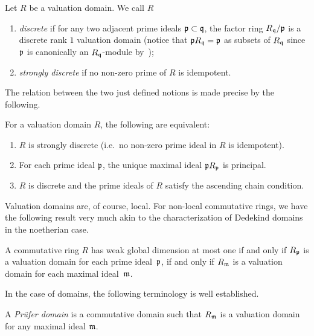 \documentclass[reqno,a4paper]{amsart}
\begin{document}
\begin{definition} \label{def:discrete-VD} Let $R$ be a valuation domain. We call $R$
\begin{enumerate}
\item \emph{discrete} if for any two adjacent prime ideals $\mathfrak{p}\subset\mathfrak{q}$, the factor ring $R_{\mathfrak{q}}/\mathfrak{p}$ is a discrete rank $1$ valuation domain (notice that $\mathfrak{p} R_{\mathfrak{q}} = \mathfrak{p}$ as subsets of $R_{\mathfrak{q}}$ since $\mathfrak{p}$ is canonically an $R_{\mathfrak{q}}$-module by~\cite[Lemma~4.3(iv)]{fs01});
\item \emph{strongly discrete} if no non-zero prime of $R$ is idempotent.
\end{enumerate}
\end{definition}

The relation between the two just defined notions is made precise by the following.

\begin{theorem}[{\cite[\S II Theorem 8.3]{fs01}}]\label{thm:propertiesStrong}
For a valuation domain $R$, the following are equivalent:
\begin{enumerate}
    \item $R$ is strongly discrete (i.e.\ no non-zero prime ideal in $R$ is idempotent).
    \item For each prime ideal $\mathfrak{p}$, the unique maximal ideal $\mathfrak{p} R_{\mathfrak{p}}$ is principal.
    \item $R$ is discrete and the prime ideals of $R$ satisfy the ascending chain condition.
\end{enumerate}
\end{theorem}

Valuation domains are, of course, local. For non-local commutative rings, we have the following result very much akin to the characterization of Dedekind domains in the noetherian case.

\begin{lemma}\label{lem:wgld1}
    A commutative ring $R$ has weak global dimension at most one if and only if $R_{\mathfrak{p}}$ is a valuation domain for each prime ideal~$\mathfrak{p}$, if and only if $R_{\mathfrak{m}}$ is a valuation domain for each maximal ideal~$\mathfrak{m}$.
\end{lemma}

In the case of domains, the following terminology is well established.

\begin{definition}[{\cite[\S III.1]{fs01}}] \label{def:Pruefer}
A \emph{Pr\"ufer domain} is a commutative domain such that $R_{\mathfrak{m}}$ is a valuation domain for any maximal ideal $\mathfrak{m}$.
\end{definition}
\end{document}
